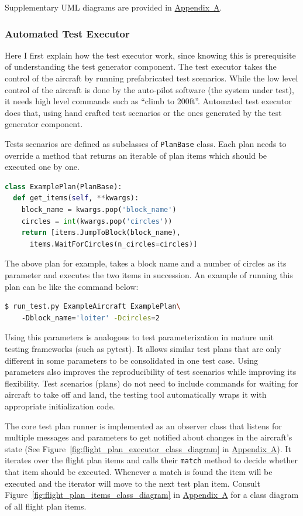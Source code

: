 Supplementary UML diagrams are provided in \hyperref[appendixa]{Appendix~A}.


\subsubsection{Automated Test Executor}
Here I first explain how the test executor work, since knowing this is prerequisite of understanding the test generator component.
The test executor takes the control of the aircraft by running prefabricated test scenarios. While the low level control of the aircraft is done by the auto-pilot software (the system under test), it needs high level commands such as ``climb to 200ft''. Automated test executor does that, using hand crafted test scenarios or the ones generated by the test generator component.

Tests scenarios are defined as subclasses of \verb|PlanBase| class. Each plan needs to override a method that returns an iterable of plan items which should be executed one by one. 
\begin{lstlisting}[language=Python, basicstyle=\linespread{0.1}]
class ExamplePlan(PlanBase):
  def get_items(self, **kwargs):
    block_name = kwargs.pop('block_name')
    circles = int(kwargs.pop('circles'))
    return [items.JumpToBlock(block_name),
      items.WaitForCircles(n_circles=circles)]
\end{lstlisting}
The above plan for example, takes a block name and a number of circles as its parameter and executes the two items in succession. An example of running this plan can be like the command below:
\begin{lstlisting}[language=bash]
$ run_test.py ExampleAircraft ExamplePlan\ 
    -Dblock_name='loiter' -Dcircles=2
\end{lstlisting}
Using this parameters is analogous to test parameterization in mature unit testing frameworks (such as pytest). It allows similar test plans that are only different in some parameters to be consolidated in one test case.
Using parameters also improves the reproducibility of test scenarios while improving its flexibility. Test scenarios (plans) do not need to include commands for waiting for aircraft to take off and land, the testing tool automatically wraps it with appropriate initialization code.

The core test plan runner is implemented as an observer class that listens for multiple messages and parameters to get notified about changes in the aircraft's state (See Figure~\ref{fig:flight_plan_executor_class_diagram} in \hyperref[appendixa]{Appendix~A}). It iterates over the flight plan items and calls their \verb|match| method to decide whether that item should be executed. Whenever a match is found the item will be executed and the iterator will move to the next test plan item. Consult Figure~\ref{fig:flight_plan_items_class_diagram} in \hyperref[appendixa]{Appendix~A} for a class diagram of all flight plan items.

